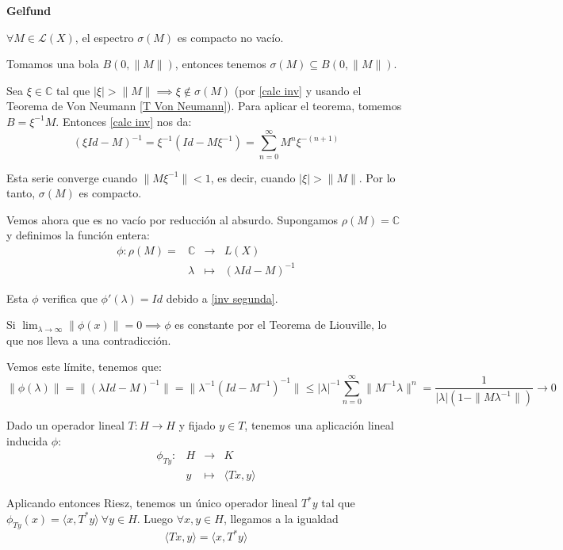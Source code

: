\documentclass[openany]{book}
\begin{document}
\begin{theorem}
    \textbf{Gelfund}

    $ \forall M \in \mathcal{L}(X)$, el espectro $ \sigma(M)$ es compacto no vacío.
\end{theorem}

\begin{demonstration}
    Tomamos una bola $ B(0,\|M\|)$, entonces tenemos $ \sigma(M) \subseteq B(0,\|M\|)$.
    
    Sea $ \xi \in \mathbb{C}$ tal que $ |\xi| > \|M\| \implies \xi \not \in \sigma(M)$ (por \eqref{calc inv} y usando el Teorema de Von Neumann \ref{T Von Neumann}). Para aplicar el teorema, tomemos $ B = \xi ^{-1} M $. Entonces \eqref{calc inv} nos da:
    $$ (\xi Id -M) ^{-1} = \xi^{-1} (Id -M \xi ^{-1}) = \sum\limits_{n=0}^{\infty}M^{n}\xi^{-(n+1)} $$

    Esta serie converge cuando $ \|M\xi ^{-1}\| < 1 $, es decir, cuando $ |\xi| > \|M\|$. Por lo tanto, $ \sigma(M) $ es compacto.

    Vemos ahora que es no vacío por reducción al absurdo. Supongamos $ \rho(M) = \mathbb{C}$ y definimos la función entera:
    $$ 
    \begin{aligned}
        \phi:\rho(M) = & \mathbb{C} & \to & L(X)\\ 
        & \lambda  & \mapsto & (\lambda Id-M) ^{-1}
    \end{aligned}
    $$

    Esta $ \phi$ verifica que $ \phi'(\lambda )= Id $ debido a \eqref{inv segunda}.

    Si $ \lim_{\lambda  \to \infty}\|\phi(x)\| = 0 \implies \phi $ es constante por el Teorema de Liouville, lo que nos lleva a una contradicción.

    Vemos este límite, tenemos que:
    $$ \|\phi(\lambda )\| = \|(\lambda  Id -M)^{-1}\| = \|\lambda ^{-1}(Id-M ^{-1}) ^{-1}\| \leq  |\lambda | ^{-1}\sum\limits_{n=0}^{\infty} \|M ^{-1}\lambda \|^{n} = \dfrac{1}{|\lambda| (1-\|M\lambda ^{-1}\|) } \to 0 $$
\end{demonstration}

Dado un operador lineal $ T: H \to H$ y fijado $ y \in T$, tenemos una aplicación lineal inducida $ \phi$:
$$
\begin{aligned}
    \phi_{Ty}: & H & \to & K\\ 
    & y & \mapsto & \langle Tx, y \rangle
\end{aligned}
$$

Aplicando entonces Riesz, tenemos un único operador lineal $ T^*y$ tal que $ \phi_{Ty}(x) = \langle x, T^{*}y \rangle \ \forall y \in H$.
Luego $ \forall x,y \in H$, llegamos a la igualdad
\begin{equation}
    \langle Tx, y \rangle = \langle x, T^*y \rangle
    \label{def T*}
    \end{equation}
\end{document}
